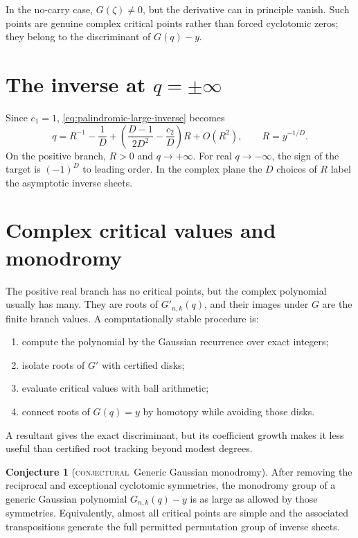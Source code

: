 \documentclass[11pt,letterpaper,oneside,openany]{book}
\theoremstyle{definition}
\newtheorem{conjecture}[theorem]{Conjecture}
\theoremstyle{remark}
\newcommand{\statusconjectural}{\textcolor{conjectureorange}{\textsc{conjectural}}}
\begin{document}
In the no-carry case, \(G(\zeta)\ne0\), but the derivative can in principle
vanish.  Such points are genuine complex critical points rather than forced
cyclotomic zeros; they belong to the discriminant of
\(G(q)-y\).

\section{The inverse at \texorpdfstring{\(q=\pm\infty\)}{q=+-infinity}}
Since \(c_1=1\), \eqref{eq:palindromic-large-inverse} becomes
\begin{equation}\label{eq:gaussian-large-inverse}
 q=R^{-1}-\frac1D+
 \left(\frac{D-1}{2D^2}-\frac{c_2}{D}\right)R+O(R^2),
 \qquad R=y^{-1/D}.
\end{equation}
On the positive branch, \(R>0\) and \(q\to+\infty\).  For real
\(q\to-\infty\), the sign of the target is \((-1)^D\) to leading order.  In
the complex plane the \(D\) choices of \(R\) label the asymptotic inverse
sheets.

\section{Complex critical values and monodromy}
The positive real branch has no critical points, but the complex polynomial
usually has many.  They are roots of \(G'_{n,k}(q)\), and their images under
\(G\) are the finite branch values.  A computationally stable procedure is:
\begin{enumerate}[label=(\arabic*)]
\item compute the polynomial by the Gaussian recurrence over exact integers;
\item isolate roots of \(G'\) with certified disks;
\item evaluate critical values with ball arithmetic;
\item connect roots of \(G(q)=y\) by homotopy while avoiding those disks.
\end{enumerate}
A resultant gives the exact discriminant, but its coefficient growth makes it
less useful than certified root tracking beyond modest degrees.

\begin{conjecture}[\statusconjectural\ Generic Gaussian monodromy]
After removing the reciprocal and exceptional cyclotomic symmetries, the
monodromy group of a generic Gaussian polynomial \(G_{n,k}(q)-y\) is as large
as allowed by those symmetries.  Equivalently, almost all critical points are
simple and the associated transpositions generate the full permitted
permutation group of inverse sheets.
\end{conjecture}
\end{document}
